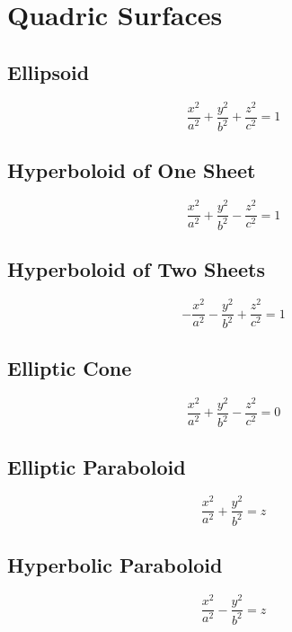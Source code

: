 \documentclass[a4paper,12pt,openany]{book}
\begin{document}
\section{Quadric Surfaces}

\subsection{Ellipsoid}
\begin{equation}\label{Equation of an Ellipsoid}
    \dfrac{x^2}{a^2} + \dfrac{y^2}{b^2} + \dfrac{z^2}{c^2} = 1
\end{equation}

\subsection{Hyperboloid of One Sheet}
\begin{equation}\label{Equation of a Hyperboloid of One Sheet}
    \dfrac{x^2}{a^2} + \dfrac{y^2}{b^2} - \dfrac{z^2}{c^2} = 1
\end{equation}

\subsection{Hyperboloid of Two Sheets}
\begin{equation}\label{Equation of a Hyperboloid of Two Sheets}
    -\dfrac{x^2}{a^2} - \dfrac{y^2}{b^2} + \dfrac{z^2}{c^2} = 1
\end{equation}

\subsection{Elliptic Cone}
\begin{equation}\label{Equation of an Elliptic Cone}
    \dfrac{x^2}{a^2} + \dfrac{y^2}{b^2} - \dfrac{z^2}{c^2} = 0
\end{equation}

\subsection{Elliptic Paraboloid}
\begin{equation}\label{Equation of an Elliptic Paraboloid}
    \dfrac{x^2}{a^2} + \dfrac{y^2}{b^2} = z
\end{equation}

\subsection{Hyperbolic Paraboloid}
\begin{equation}\label{Equation of a Hyperbolic Paraboloid}
    \dfrac{x^2}{a^2} - \dfrac{y^2}{b^2} = z
\end{equation}
\end{document}
